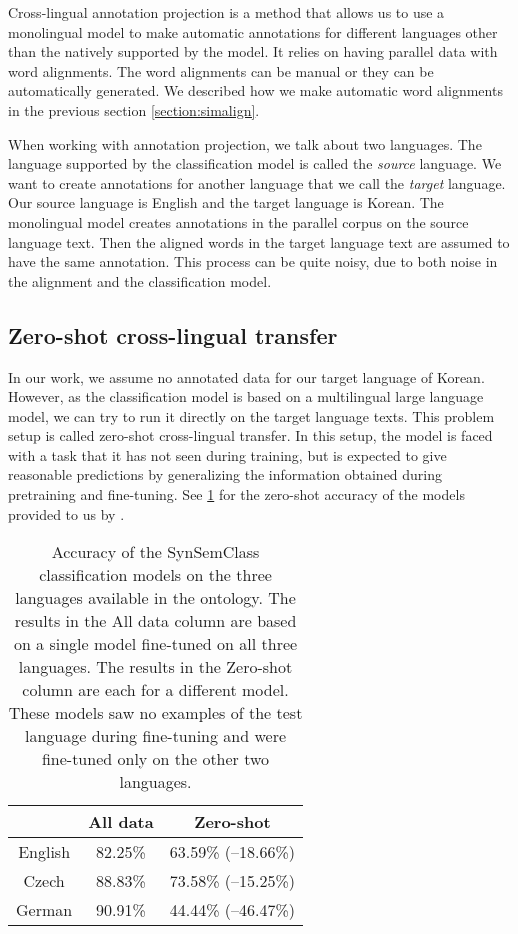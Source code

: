 Cross-lingual annotation projection is a method that allows us to use a monolingual model to make automatic annotations for different languages other than the natively supported by the model. It relies on having parallel data with word alignments. The word alignments can be manual or they can be automatically generated. We described how we make automatic word alignments in the previous section \ref{section:simalign}.

When working with annotation projection, we talk about two languages. The language supported by the classification model is called the \textit{source} language. We want to create annotations for another language that we call the \textit{target} language. Our source language is English and the target language is Korean. The monolingual model creates annotations in the parallel corpus on the source language text. Then the aligned words in the target language text are assumed to have the same annotation. This process can be quite noisy, due to both noise in the alignment and the classification model.

\subsection{Zero-shot cross-lingual transfer}

In our work, we assume no annotated data for our target language of Korean. However, as the classification model is based on a multilingual large language model, we can try to run it directly on the target language texts. This problem setup is called zero-shot cross-lingual transfer. In this setup, the model is faced with a task that it has not seen during training, but is expected to give reasonable predictions by generalizing the information obtained during pretraining and fine-tuning. See \cref{table:ssc_model} for the zero-shot accuracy of the models provided to us by \citet{SSC_LLM_Suggestions}. 

\begin{table}
\centering
\begin{tabular}{ccc} 
  & All data & Zero-shot \\
 \hline
 English & 82.25\% & 63.59\% (--18.66\%) \\ 
 Czech & 88.83\% & 73.58\% (--15.25\%) \\
 German & 90.91\% & 44.44\% (--46.47\%) \\
\end{tabular}
\caption{Accuracy of the SynSemClass classification models on the three languages available in the ontology. The results in the All data column are based on a single model fine-tuned on all three languages. The results in the Zero-shot column are each for a different model. These models saw no examples of the test language during fine-tuning and were fine-tuned only on the other two languages.}
\label{table:ssc_model}
\end{table}

